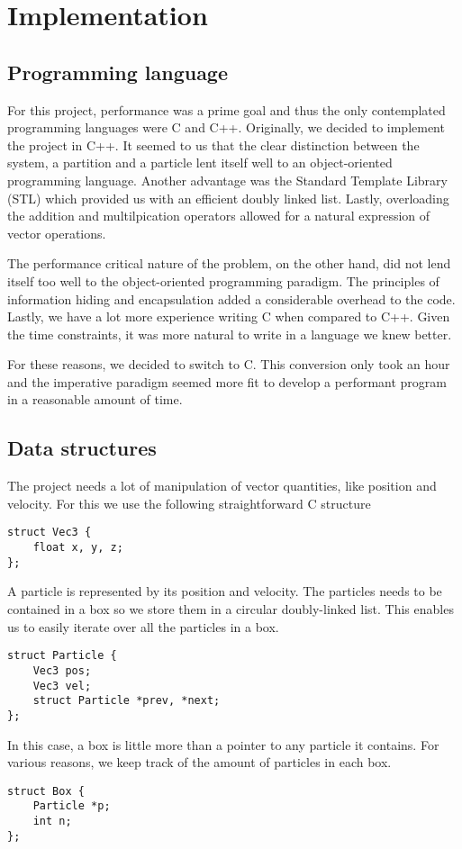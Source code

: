 \section{Implementation}

\subsection{Programming language}
For this project, performance was a prime goal and thus the only contemplated 
programming languages were C and C++.  Originally, we decided to implement the 
project in C++. It seemed to us that the clear distinction between the system, 
a partition and a particle lent itself well to an object-oriented programming 
language. Another advantage was the Standard Template Library (STL) which 
provided us with an efficient doubly linked list. Lastly, overloading the 
addition and multilpication operators allowed for a natural expression of 
vector operations.

The performance critical nature of the problem, on the other hand, did not 
lend itself too well to the object-oriented programming paradigm. The 
principles of information hiding and encapsulation added a considerable 
overhead to the code. Lastly, we have a lot more experience writing C when 
compared to C++.  Given the time constraints, it was more natural to write 
in a language we knew better.

For these reasons, we decided to switch to C.  This conversion only took an 
hour and the imperative paradigm seemed more fit to develop a performant 
program in a reasonable amount of time.

\subsection{Data structures}

The project needs a lot of manipulation of vector quantities, like position 
and velocity. For this we use the following straightforward C structure

\begin{lstlisting}
struct Vec3 {
	float x, y, z;
};
\end{lstlisting}

A particle is represented by its position and velocity. The particles needs 
to be contained in a box so we store them in a circular doubly-linked list.  
This enables us to easily iterate over all the particles in a box.
\begin{lstlisting}
struct Particle {
	Vec3 pos;
	Vec3 vel;
	struct Particle *prev, *next;
};
\end{lstlisting}
In this case, a box is little more than a pointer to any particle it contains.  
For various reasons, we keep track of the amount of particles in each box.
\begin{lstlisting}
struct Box {
	Particle *p;
	int n;
};
\end{lstlisting}


